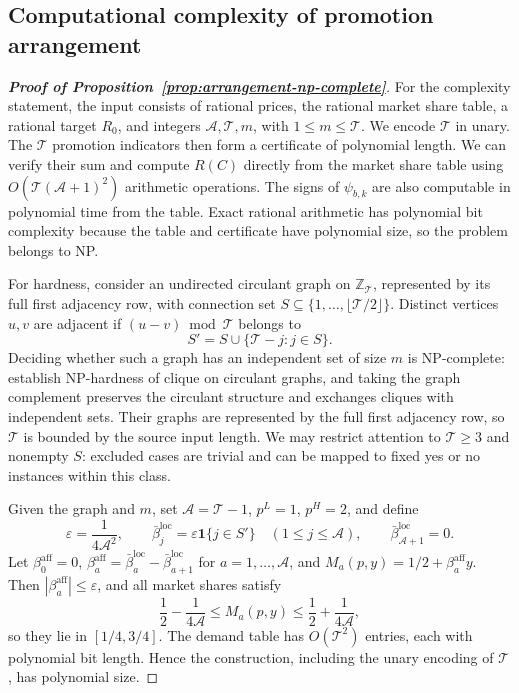 \subsection{Computational complexity of promotion arrangement}
\label{app:arrangement-complexity}

\begin{proof}[\normalfont\bfseries Proof of Proposition~\ref{prop:arrangement-np-complete}]
For the complexity statement, the input consists of rational prices, the rational market share table, a rational target \(R_0\), and integers \(\mathcal A,\mathcal T,m\), with \(1\le m\le\mathcal T\). We encode \(\mathcal T\) in unary. The \(\mathcal T\) promotion indicators then form a certificate of polynomial length. We can verify their sum and compute \(R(C)\) directly from the market share table using \(O(\mathcal T(\mathcal A+1)^2)\) arithmetic operations. The signs of \(\psi_{b,k}\) are also computable in polynomial time from the table. Exact rational arithmetic has polynomial bit complexity because the table and certificate have polynomial size, so the problem belongs to NP.

For hardness, consider an undirected circulant graph on \(\mathbb Z_{\mathcal T}\), represented by its full first adjacency row, with connection set \(S\subseteq\{1,\ldots,\lfloor\mathcal T/2\rfloor\}\). Distinct vertices \(u,v\) are adjacent if \((u-v)\bmod\mathcal T\) belongs to
\[
    S'=S\cup\{\mathcal T-j:j\in S\}.
\]
Deciding whether such a graph has an independent set of size \(m\) is NP-complete: \citet{codenotti1998circulant} establish NP-hardness of clique on circulant graphs, and taking the graph complement preserves the circulant structure and exchanges cliques with independent sets. Their graphs are represented by the full first adjacency row, so \(\mathcal T\) is bounded by the source input length. We may restrict attention to \(\mathcal T\ge3\) and nonempty \(S\): excluded cases are trivial and can be mapped to fixed yes or no instances within this class.

Given the graph and \(m\), set \(\mathcal A=\mathcal T-1\), \(p^L=1\), \(p^H=2\), and define
\[
    \varepsilon=\frac{1}{4\mathcal A^2},\qquad
    \bar\beta_j^{\mathrm{loc}}=\varepsilon\mathbf 1\{j\in S'\}
    \quad (1\le j\le\mathcal A),\qquad
    \bar\beta_{\mathcal A+1}^{\mathrm{loc}}=0.
\]
Let \(\beta_0^{\mathrm{aff}}=0\), \(\beta_a^{\mathrm{aff}}=\bar\beta_a^{\mathrm{loc}}-\bar\beta_{a+1}^{\mathrm{loc}}\) for \(a=1,\ldots,\mathcal A\), and \(M_a(p,y)=1/2+\beta_a^{\mathrm{aff}} y\). Then \(|\beta_a^{\mathrm{aff}}|\le\varepsilon\), and all market shares satisfy
\[
    \frac12-\frac{1}{4\mathcal A}
    \le M_a(p,y)\le
    \frac12+\frac{1}{4\mathcal A},
\]
so they lie in \([1/4,3/4]\). The demand table has \(O(\mathcal T^2)\) entries, each with polynomial bit length. Hence the construction, including the unary encoding of \(\mathcal T\), has polynomial size.


\end{proof}
